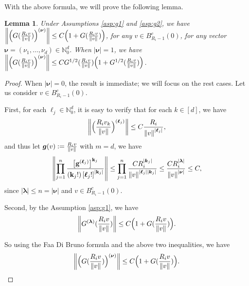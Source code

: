 \documentclass[a4paper, 11pt]{article}
\newcounter{results}[section]
\theoremstyle{plain}
\newtheorem{lemma}[results]{Lemma}
\theoremstyle{remark}
\theoremstyle{definition}
\begin{document}
		
		With the above formula, we will prove the following lemma.
		\begin{lemma}\label{lem:g1}Under Assumptions \ref{asp:g1} and \ref{asp:g2}, we have $\norm{\Big(G(\frac{R_i v}{\norm{v}})\Big)^{(\boldsymbol{\nu})}}\leq C\Big(1+G(\frac{R_i v}{\norm{v}})\Big)$, for any $v\in B_{R_i-1}^c(0)$, for any vector $\boldsymbol{\nu}=\left(\nu_1, \ldots, \nu_d\right) \in \mathbb{N}_0^d$. When $|\boldsymbol{\nu}|=1$, we have $\norm{\Big(G(\frac{R_i v}{\norm{v}})\Big)^{(\boldsymbol{\nu})}}\leq CG^{1/2}(\frac{R_i v}{\norm{v}})\Big(1+G^{1/2}(\frac{R_i v}{\norm{v}})\Big)$.
		\end{lemma}
		\begin{proof}
			When $|\boldsymbol{\nu}|=0$, the result is immediate; 	we will focus on the rest cases. Let us consider $v\in B^c_{R_i-1}(0)$.
			
			First, for each $\boldsymbol{\ell}_j\in\mathbb{N}_0^d$,  it is easy to verify that for each $k\in [d]$, we have 
			\begin{equation}\label{eq:g74}
				\norm{\Big(\frac{R_i v_k}{\norm{v}}\Big)^{(\boldsymbol{\ell}_j)}}\leq C\frac{R_i}{\norm{v}^{|\boldsymbol{\ell}_j|}},
			\end{equation}
			and thus let $\boldsymbol{g}(v):=\frac{R_i v}{\norm{v}}$ with $m=d$, we have 
			\begin{equation}
				\norm{ \prod_{j=1}^n \frac{\left[\mathbf{g}^{(\boldsymbol{\ell}_j)}\right]^{\mathbf{k}_j}}{\left(\mathbf{k}_{j}!\right)\left[\boldsymbol{\ell}_{j}!\right]^{\left|\mathbf{k}_j\right|}}}\leq  \prod_{j=1}^n\frac{CR^{|\boldsymbol{k}_j|}_i}{\norm{v}^{|\boldsymbol{\ell}_j||\boldsymbol{k}_j|}}\leq \frac{CR_i^{|\boldsymbol{\lambda}|}}{\norm{v}^{|\boldsymbol{\nu}|}}\leq C,
			\end{equation}
			since $|\boldsymbol{\lambda}| \leq n=|\boldsymbol{\nu}|$ and $v\in B_{R_i-1}^c(0)$.
			
			Second, by the Assumption \ref{asp:g1}, we have 
			\begin{equation}
				\norm{G^{(\boldsymbol{\lambda})}(\frac{R_i v}{\norm{v}})}\leq C\Big(1+G(\frac{R_i v}{\norm{v}})\Big).
			\end{equation}
			
			So using the Faa Di Bruno formula and the above two inequalities, we have
			\begin{equation}
				\norm{\Big(G(\frac{R_i v}{\norm{v}})\Big)^{(\boldsymbol{\nu})}}\leq C\Big(1+G(\frac{R_i v}{\norm{v}})\Big).
			\end{equation}
			

\end{proof}
\end{document}
